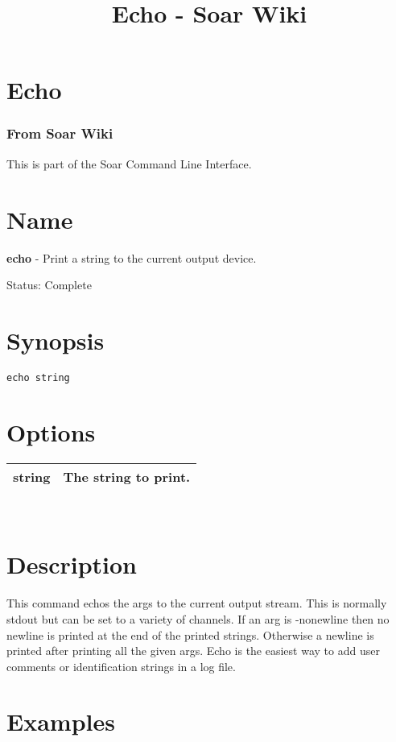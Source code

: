 \documentclass[10pt]{article}
\title{Echo - Soar Wiki}
\begin{document}
\section*{Echo}
\subsubsection*{From Soar Wiki}


 This is part of the Soar Command Line Interface. 
\section*{ Name }


 \textbf{echo}
 - Print a string to the current output device. 


 Status: Complete
\section*{ Synopsis }
\begin{verbatim}
echo string

\end{verbatim}
\section*{ Options }


\begin{tabular}{|c|c|}
\hline 
 string  & The string to print.  \\
 \hline 

\end{tabular}



 \\ 

\section*{ Description }


 This command echos the args to the current output stream. This is normally stdout but can be set to a variety of channels. If an arg is -nonewline then no newline is printed at the end of the printed strings. Otherwise a newline is printed after printing all the given args. Echo is the easiest way to add user comments or identification strings in a log file. 
\section*{ Examples }
\end{document}
